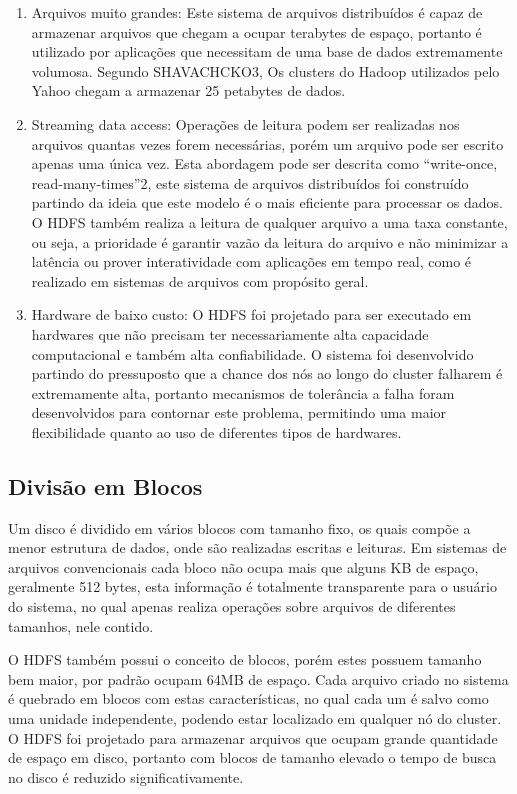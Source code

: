 \begin{enumerate}

\item Arquivos muito grandes: Este sistema de arquivos distribuídos é capaz de armazenar arquivos  que chegam a ocupar terabytes de espaço, portanto é utilizado por aplicações que necessitam de uma base de dados extremamente volumosa. Segundo SHAVACHCKO3, Os clusters do Hadoop utilizados pelo Yahoo chegam a armazenar 25 petabytes de dados.
\item Streaming data access: Operações de leitura podem ser realizadas nos arquivos quantas vezes forem necessárias, porém um arquivo pode ser escrito apenas uma única vez. Esta abordagem pode ser descrita como “write-once, read-many-times”2, este sistema de arquivos distribuídos foi construído partindo da ideia que este modelo é o mais eficiente para processar os dados. O HDFS também realiza a leitura de qualquer arquivo a uma taxa constante, ou seja, a prioridade é garantir vazão da leitura do arquivo e não minimizar a latência ou prover interatividade com aplicações em tempo real, como é realizado em sistemas de arquivos com propósito geral.
\item Hardware de baixo custo: O HDFS foi projetado para ser executado em hardwares que não precisam ter necessariamente alta capacidade computacional e também alta confiabilidade. O sistema foi desenvolvido partindo do pressuposto que a chance dos nós ao longo do cluster falharem é extremamente alta, portanto mecanismos de tolerância a falha foram desenvolvidos para contornar este problema, permitindo uma maior flexibilidade quanto ao uso de diferentes tipos de hardwares.

\end{enumerate}


\subsection{Divisão em Blocos}

Um disco é dividido em vários blocos com tamanho fixo, os quais compõe a menor estrutura de dados, onde são realizadas escritas e leituras. Em sistemas de arquivos convencionais cada bloco não ocupa mais que alguns KB de espaço, geralmente 512 bytes, esta informação é totalmente transparente para o usuário do sistema, no qual apenas realiza operações sobre arquivos de diferentes tamanhos, nele contido.

O HDFS também possui o conceito de blocos, porém estes possuem tamanho bem maior, por padrão ocupam 64MB de espaço. Cada arquivo criado no sistema é quebrado em blocos com estas características, no qual cada um é salvo como uma unidade independente, podendo estar localizado em qualquer nó do cluster. O HDFS foi projetado para armazenar arquivos que ocupam grande quantidade de espaço em disco, portanto com blocos de tamanho elevado o tempo de busca no disco é reduzido significativamente.



